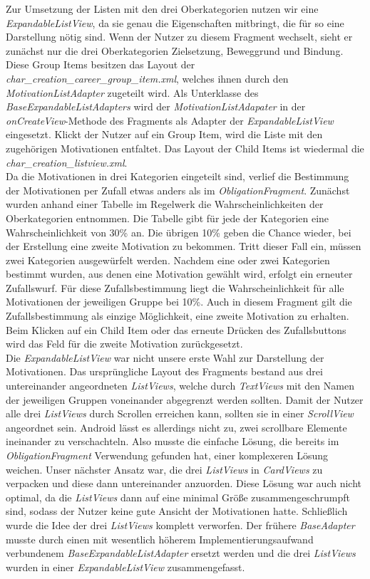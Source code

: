Zur Umsetzung der Listen mit den drei Oberkategorien nutzen wir eine \textit{ExpandableListView}, da sie genau die Eigenschaften mitbringt, die für so eine Darstellung nötig sind. Wenn der Nutzer zu diesem Fragment wechselt, sieht er zunächst nur die drei Oberkategorien Zielsetzung, Beweggrund und Bindung. Diese Group Items besitzen das Layout der \textit{char\_creation\_career\_group\_item.xml}, welches ihnen durch den \textit{MotivationListAdapter} zugeteilt wird. Als Unterklasse des \textit{BaseExpandableListAdapters} wird der \textit{MotivationListAdapater} in der \textit{onCreateView}-Methode des Fragments als Adapter der \textit{ExpandableListView} eingesetzt. Klickt der Nutzer auf ein Group Item, wird die Liste mit den zugehörigen Motivationen entfaltet. Das Layout der Child Items ist wiedermal die \textit{char\_creation\_listview.xml}.\\

Da die Motivationen in drei Kategorien eingeteilt sind, verlief die Bestimmung der Motivationen per Zufall etwas anders als im \textit{ObligationFragment}. Zunächst wurden anhand einer Tabelle im Regelwerk \cite[94]{rulebook} die Wahrscheinlichkeiten der Oberkategorien entnommen. Die Tabelle gibt für jede der Kategorien eine Wahrscheinlichkeit von 30\% an. Die übrigen 10\% geben die Chance wieder, bei der Erstellung eine zweite Motivation zu bekommen. Tritt dieser Fall ein, müssen zwei Kategorien ausgewürfelt werden. Nachdem eine oder zwei Kategorien bestimmt wurden, aus denen eine Motivation gewählt wird, erfolgt ein erneuter Zufallswurf. Für diese Zufallsbestimmung liegt die Wahrscheinlichkeit für alle Motivationen der jeweiligen Gruppe bei 10\%. Auch in diesem Fragment gilt die Zufallsbestimmung als einzige Möglichkeit, eine zweite Motivation zu erhalten. Beim Klicken auf ein Child Item oder das erneute Drücken des Zufallsbuttons wird das Feld für die zweite Motivation zurückgesetzt.\\

Die \textit{ExpandableListView} war nicht unsere erste Wahl zur Darstellung der Motivationen. Das ursprüngliche Layout des Fragments bestand aus drei untereinander angeordneten \textit{ListViews}, welche
durch \textit{TextViews} mit den Namen der jeweiligen Gruppen voneinander abgegrenzt werden sollten. Damit der Nutzer alle drei \textit{ListViews} durch Scrollen erreichen kann, sollten sie in einer \textit{ScrollView} angeordnet sein. Android lässt es allerdings nicht zu, zwei scrollbare Elemente ineinander zu verschachteln. Also musste die einfache Lösung, die bereits im \textit{ObligationFragment} Verwendung gefunden hat, einer komplexeren Lösung weichen. Unser nächster Ansatz war, die drei \textit{ListViews} in \textit{CardViews} zu verpacken und diese dann untereinander anzuorden. Diese Lösung war auch nicht optimal, da die \textit{ListViews} dann auf eine minimal Größe zusammengeschrumpft sind, sodass der Nutzer keine gute Ansicht der Motivationen hatte. Schließlich wurde die Idee der drei \textit{ListViews} komplett verworfen. Der frühere \textit{BaseAdapter} musste durch einen mit wesentlich höherem Implementierungsaufwand verbundenem \textit{BaseExpandableListAdapter} ersetzt werden und die drei \textit{ListViews} wurden in einer \textit{ExpandableListView} zusammengefasst.

